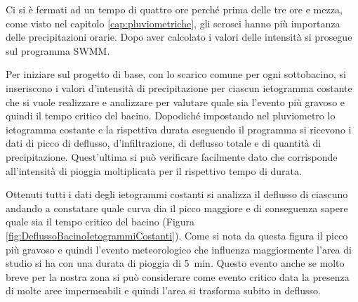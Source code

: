 Ci si è fermati ad un tempo di quattro ore perché prima delle tre ore e mezza, come visto nel capitolo \ref{cap:pluviometriche}, gli scrosci hanno più importanza delle precipitazioni orarie.
Dopo aver calcolato i valori delle intensità si prosegue sul programma SWMM.

Per iniziare sul progetto di base, con lo scarico comune per ogni sottobacino, si inseriscono i valori d'intensità di precipitazione per ciascun ietogramma costante che si vuole realizzare e analizzare per valutare quale sia l'evento più gravoso e quindi il tempo critico del bacino. 
Dopodiché impostando nel pluviometro lo ietogramma costante e la rispettiva durata eseguendo il programma si ricevono i dati di picco di deflusso, d'infiltrazione, di deflusso totale e di quantità di precipitazione.
Quest'ultima si può verificare facilmente dato che corrisponde all'intensità di pioggia moltiplicata per il rispettivo tempo di durata.

Ottenuti tutti i dati degli ietogrammi costanti si analizza il deflusso di ciascuno andando a constatare quale curva dia il picco maggiore e di conseguenza sapere quale sia il tempo critico del bacino (Figura \ref{fig:DeflussoBacinoIetogrammiCostanti}). 
Come si nota da questa figura il picco più gravoso e quindi l'evento meteorologico che influenza maggiormente l'area di studio si ha con una durata di pioggia di \SI{5}{\minute}.
Questo evento anche se molto breve per la nostra zona si può considerare come evento critico data la presenza di molte aree impermeabili e quindi l'area si trasforma subito in deflusso.

